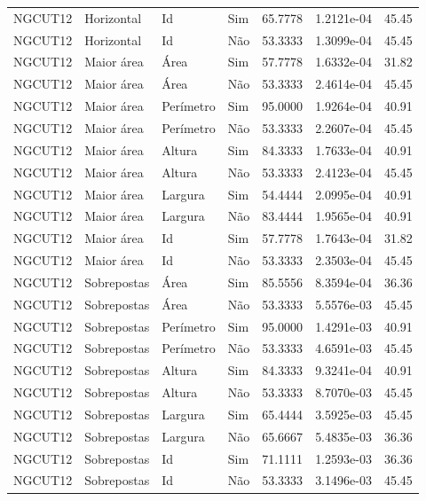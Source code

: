 \begin{tabular}{llllrrr}
    NGCUT12   & Horizontal  & Id        & Sim         & 65.7778      & 1.2121e-04 & 45.45    \\
    NGCUT12   & Horizontal  & Id        & Não         & 53.3333      & 1.3099e-04 & 45.45    \\
    NGCUT12   & Maior área  & Área      & Sim         & 57.7778      & 1.6332e-04 & 31.82    \\
    NGCUT12   & Maior área  & Área      & Não         & 53.3333      & 2.4614e-04 & 45.45    \\
    NGCUT12   & Maior área  & Perímetro & Sim         & 95.0000      & 1.9264e-04 & 40.91    \\
    NGCUT12   & Maior área  & Perímetro & Não         & 53.3333      & 2.2607e-04 & 45.45    \\
    NGCUT12   & Maior área  & Altura    & Sim         & 84.3333      & 1.7633e-04 & 40.91    \\
    NGCUT12   & Maior área  & Altura    & Não         & 53.3333      & 2.4123e-04 & 45.45    \\
    NGCUT12   & Maior área  & Largura   & Sim         & 54.4444      & 2.0995e-04 & 40.91    \\
    NGCUT12   & Maior área  & Largura   & Não         & 83.4444      & 1.9565e-04 & 40.91    \\
    NGCUT12   & Maior área  & Id        & Sim         & 57.7778      & 1.7643e-04 & 31.82    \\
    NGCUT12   & Maior área  & Id        & Não         & 53.3333      & 2.3503e-04 & 45.45    \\
    NGCUT12   & Sobrepostas & Área      & Sim         & 85.5556      & 8.3594e-04 & 36.36    \\
    NGCUT12   & Sobrepostas & Área      & Não         & 53.3333      & 5.5576e-03 & 45.45    \\
    NGCUT12   & Sobrepostas & Perímetro & Sim         & 95.0000      & 1.4291e-03 & 40.91    \\
    NGCUT12   & Sobrepostas & Perímetro & Não         & 53.3333      & 4.6591e-03 & 45.45    \\
    NGCUT12   & Sobrepostas & Altura    & Sim         & 84.3333      & 9.3241e-04 & 40.91    \\
    NGCUT12   & Sobrepostas & Altura    & Não         & 53.3333      & 8.7070e-03 & 45.45    \\
    NGCUT12   & Sobrepostas & Largura   & Sim         & 65.4444      & 3.5925e-03 & 45.45    \\
    NGCUT12   & Sobrepostas & Largura   & Não         & 65.6667      & 5.4835e-03 & 36.36    \\
    NGCUT12   & Sobrepostas & Id        & Sim         & 71.1111      & 1.2593e-03 & 36.36    \\
    NGCUT12   & Sobrepostas & Id        & Não         & 53.3333      & 3.1496e-03 & 45.45    \\
    \hline
\end{tabular}